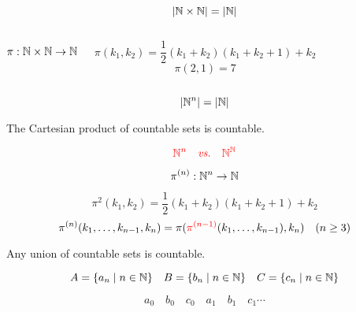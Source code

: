\begin{frame}{}
  \begin{theorem}
    \[
      |\mathbb{N} \times \mathbb{N}| = |\mathbb{N}|
    \]
  \end{theorem}

  \begin{columns}
      \pause
      \[
        \pi: \mathbb{N} \times \mathbb{N} \to \mathbb{N}
      \]

      \pause
      \[
        \pi(k_1, k_2) = \frac{1}{2} (k_1 + k_2)(k_1 + k_2 + 1) + k_2
      \]
      \[
        \pi(2, 1) = 7
      \]
  \end{columns}

  \pause
  \begin{center}
  \end{center}
\end{frame}

\begin{frame}{}
  \begin{theorem}[$\N^{n}$ is Countable.]
    \[
      |\mathbb{N}^{n}| = |\mathbb{N}|
    \]
  \end{theorem}

  \pause
  \begin{theorem}
    The Cartesian product of  countable sets is countable.
  \end{theorem}

  \pause
  \[
    \textcolor{red}{\mathbb{N}^{n} \quad \text{\it vs.} \quad \mathbb{N}^{\mathbb{N}}}
  \]

  \pause
  \[
    \pi^{(n)}:\mathbb{N}^n \to \mathbb{N}
  \]

  \pause
  \[
    \pi^{2}(k_1, k_2) = \frac{1}{2} (k_1 + k_2)(k_1 + k_2 + 1) + k_2
  \]
  \pause
  \[
    \pi^{(n)}(k_1, \ldots, k_{n-1}, k_n) = \pi (\textcolor{red}{\pi^{(n-1)}}(k_1, \ldots, k_{n-1}) , k_n)
    \quad (n \ge 3)
  \]
\end{frame}

\begin{frame}{}
  \begin{theorem}
    Any  union of countable sets is countable.
  \end{theorem}

  \pause
  \[
    A = \{a_n \mid n \in \mathbb{N}\} \quad B = \{b_n \mid n \in \mathbb{N}\} \quad C = \{c_n \mid n \in \mathbb{N}\}
  \]

  \pause
  \[
    a_0 \quad b_0 \quad c_0 \quad a_1 \quad b_1 \quad c_1 \cdots
  \]
\end{frame}

